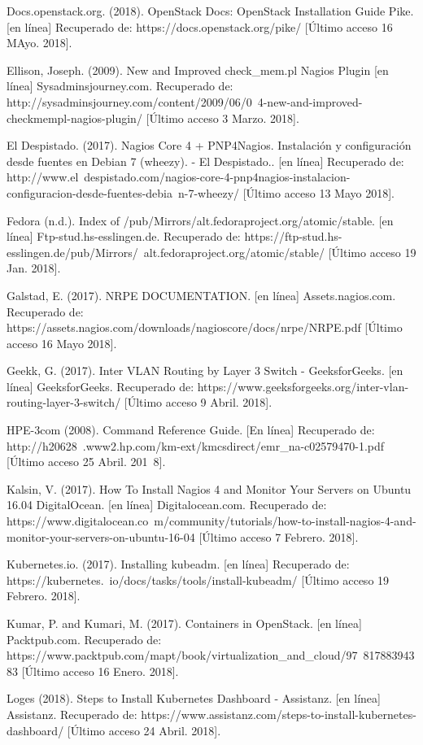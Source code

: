 Docs.openstack.org. (2018). OpenStack Docs: OpenStack Installation Guide Pike. [en línea] Recuperado de: https://docs.openstack.org/pike/ [Último acceso 16 MAyo. 2018].

Ellison, Joseph. (2009). New and Improved check\_mem.pl Nagios Plugin  [en línea] Sysadminsjourney.com. Recuperado de: http://sysadminsjourney.com/content/2009/06/0\ 4-\/new-and-improved-checkmempl-nagios-plugin/ [Último acceso 3 Marzo. 2018].    

El Despistado. (2017). Nagios Core 4 + PNP4Nagios. Instalación y configuración desde fuentes en Debian 7 (wheezy). - El Despistado.. [en línea] Recuperado de: http://www.el\ despistado.com/nagios-core-4-pnp4nagios-instalacion-configuracion-desde-fuentes-debia\ n-7-wheezy/ [Último acceso 13 Mayo 2018].

Fedora (n.d.). Index of /pub/Mirrors/alt.fedoraproject.org/atomic/stable. [en línea] Ftp-stud.hs-esslingen.de. Recuperado de: https://ftp-stud.hs-esslingen.de/pub/Mirrors/\ alt.fedoraproject.org/atomic/stable/ [Último acceso 19 Jan. 2018].

Galstad, E. (2017). NRPE DOCUMENTATION. [en línea] Assets.nagios.com. Recuperado de: https://assets.nagios.com/downloads/nagioscore/docs/nrpe/NRPE.pdf [Último acceso 16 Mayo 2018].

Geekk, G. (2017). Inter VLAN Routing by Layer 3 Switch - GeeksforGeeks. [en línea] GeeksforGeeks. Recuperado de: https://www.geeksforgeeks.org/inter-vlan-routing-layer-3-switch/ [Último acceso 9 Abril. 2018].

HPE-3com (2008). Command Reference Guide. [En línea] Recuperado de: http://h20628\ .www2.hp.com/km-ext/kmcsdirect/emr\_na-c02579470-1.pdf [Último acceso 25 Abril. 201\ 8].

Kalsin, V. (2017). How To Install Nagios 4 and Monitor Your Servers on Ubuntu 16.04  DigitalOcean. [en línea] Digitalocean.com. Recuperado de: https://www.digitalocean.co\ m/community/tutorials/how-to-install-nagios-4-and-monitor-your-servers-on-ubuntu-16-04 [Último acceso 7 Febrero. 2018].

Kubernetes.io. (2017). Installing kubeadm. [en línea] Recuperado de: https://kubernetes.\ io/docs/tasks/tools/install-kubeadm/ [Último acceso 19 Febrero. 2018].

Kumar, P. and Kumari, M. (2017). Containers in OpenStack. [en línea] Packtpub.com. Recuperado de: https://www.packtpub.com/mapt/book/virtualization\_and\_cloud/97\ 81788394383 [Último acceso 16 Enero. 2018].

Loges (2018). Steps to Install Kubernetes Dashboard - Assistanz. [en línea] Assistanz. Recuperado de: https://www.assistanz.com/steps-to-install-kubernetes-dashboard/ [Último acceso 24 Abril. 2018].

